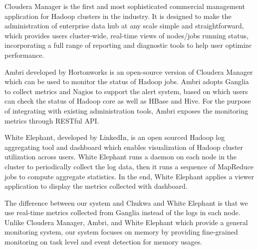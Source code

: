 Cloudera Manager\cite{http://www.cloudera.com} is the first and most sophisticated commercial management application for Hadoop clusters in the industry. 
It is designed to make the administration of enterprise data hub at any scale simple and straightforward, which provides users cluster-wide, real-time views of nodes/jobs running status, incorporating a full range of reporting and diagnostic tools to help user optimize performance.

Ambri\cite{http://hortonworks.com/hadoop/ambari} developed by Hortonworks is an open-source version of Cloudera Manager which can be used to monitor the status of Hadoop jobs.
Ambri adopts Ganglia to collect metrics and Nagios to support the alert system, based on which users can check the status of Hadoop core as well as HBase and Hive.
For the purpose of integrating with existing administration tools, Ambri exposes the monitoring metrics through RESTful API.
\par
White Elephant\cite{http://data.linkedin.com/opensource/white-elephant}, developed by LinkedIn, is an open sourced Hadoop log aggregating tool and dashboard which enables visualization of Hadoop cluster utilization across users. 
White Elephant runs a daemon on each node in the cluster to periodically collect the log data, then it runs a sequence of MapReduce jobs to compute aggregate statistics. In the end, White Elephant applies a viewer application to display the metrics collected with dashboard.
\par
The difference between our system and Chukwa and White Elephant is that we use real-time metrics collected from Ganglia instead of the logs in each node.
Unlike Cloudera Manager, Ambri, and White Elephant which provide a general monitoring system, our system focuses on memory by providing fine-grained monitoring on task level and event detection for memory usages.


